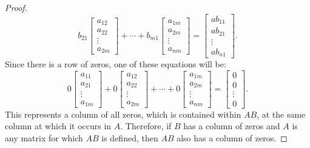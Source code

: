 \documentclass{article}
\begin{document}
\begin{enumerate}
{\begin{enumerate}
\begin{proof}
\[                    b_{21}\begin{bmatrix} a_{12} \\ a_{22} \\ \vdots \\ a_{2m}\end{bmatrix} + \cdots +
                    b_{m1}\begin{bmatrix} a_{1m} \\ a_{2m} \\ \vdots \\ a_{nm}\end{bmatrix} =
                    \begin{bmatrix}ab_{11} \\ ab_{21} \\ \vdots \\ ab_{n1} \end{bmatrix}.
                \]
                Since there is a row of zeros, one of these equations will be:
                \[
                    0\begin{bmatrix} a_{11} \\ a_{21} \\ \vdots \\ a_{1m}\end{bmatrix} +
                    0\begin{bmatrix} a_{12} \\ a_{22} \\ \vdots \\ a_{2m}\end{bmatrix} + \cdots +
                    0\begin{bmatrix} a_{1m} \\ a_{2m} \\ \vdots \\ a_{nm}\end{bmatrix} =
                    \begin{bmatrix}0 \\ 0 \\ \vdots \\ 0 \end{bmatrix}.
                \]
                This represents a column of all zeros, which is contained within $AB$, at the same column at which it occurs in $A$. Therefore, if $B$ has a column of zeros and $A$ is any matrix for which $AB$ is defined, then $AB$ also has a column of zeros.
            \end{proof}
        \end{enumerate}}
\end{enumerate}
\end{document}
